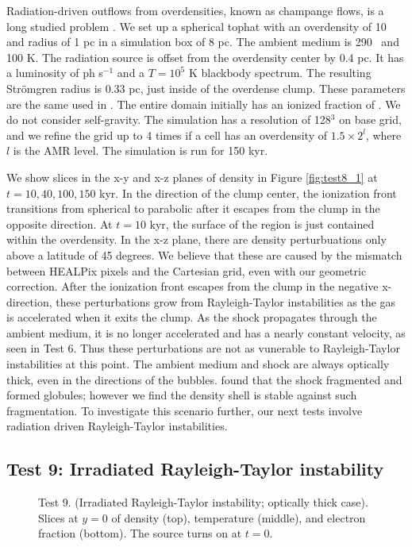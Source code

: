 \documentclass[12pt,preprint]{aastex}
\begin{document}
Radiation-driven outflows from overdensities, known as champange
flows, is a long studied problem \citep[e.g.][\S3.3]{Yorke86}.  We set
up a spherical tophat with an overdensity of 10 and radius of 1 pc in
a simulation box of 8 pc.  The ambient medium is 290 \cubecm~and 100
K.  The radiation source is offset from the overdensity center by 0.4
pc.  It has a luminosity of  ph s$^{-1}$ and a $T=10^5$ K
blackbody spectrum.  The resulting Str\"{o}mgren radius is 0.33 pc,
just inside of the overdense clump.  These parameters are the same
used in \citet{Bisbas09}.  The entire domain initially has an ionized
fraction of .  We do not consider self-gravity.  The
simulation has a resolution of 128$^3$ on base grid, and we refine the
grid up to 4 times if a cell has an overdensity of $1.5 \times 2^l$,
where $l$ is the AMR level.  The simulation is run for 150 kyr.

We show slices in the x-y and x-z planes of density in Figure
\ref{fig:test8_1} at $t = 10, 40, 100, 150$ kyr.  In the direction of
the clump center, the ionization front transitions from spherical to
parabolic after it escapes from the clump in the opposite direction.
At $t = 10$ kyr, the surface of the  region is just
contained within the overdensity.  In the x-z plane, there are density
perturbuations only above a latitude of 45 degrees.  We believe that
these are caused by the mismatch between HEALPix pixels and the
Cartesian grid, even with our geometric correction.  After the
ionization front escapes from the clump in the negative x-direction,
these perturbations grow from Rayleigh-Taylor instabilities as the gas
is accelerated when it exits the clump.  As the shock propagates
through the ambient medium, it is no longer accelerated and has a
nearly constant velocity, as seen in Test 6.  Thus these perturbations
are not as vunerable to Rayleigh-Taylor instabilities at this point.
The ambient medium and shock are always optically thick, even in the
directions of the bubbles.  \citeauthor{Bisbas09} found that the shock
fragmented and formed globules; however we find the density shell is
stable against such fragmentation.  To investigate this scenario
further, our next tests involve radiation driven Rayleigh-Taylor
instabilities.

\subsection{Test 9: Irradiated Rayleigh-Taylor instability}

\begin{figure}[t]
  \caption{\label{fig:test9_thick} Test 9. (Irradiated Rayleigh-Taylor
    instability; optically thick case).  Slices at $y=0$ of density
    (top), temperature (middle), and electron fraction (bottom).  The
    source turns on at $t=0$.}
\end{figure}
\end{document}

